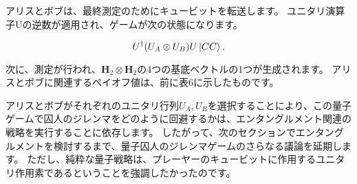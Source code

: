 アリスとボブは、最終測定のためにキュービットを転送します。 ユニタリ演算子Uの逆数が適用され、ゲームが次の状態になります。

\begin{equation}
\label{123}
U^{\dagger} ( U_A \otimes U_B ) U \ket{CC}.
\end{equation}

次に、測定が行われ、$\mathbf{H}_2 \otimes \mathbf{H}_2$の4つの基底ベクトルの1つが生成されます。 アリスとボブに関連するペイオフ値は、前に表6に示したものです。

アリスとボブがそれぞれのユニタリ行列$U_A, U_B$を選択することにより、この量子ゲームで囚人のジレンマをどのように回避するかは、エンタングルメント関連の戦略を実行することに依存します。 したがって、次のセクションでエンタングルメントを検討するまで、量子囚人のジレンマゲームのさらなる議論を延期します。 ただし、純粋な量子戦略は、プレーヤーのキュービットに作用するユニタリ作用素であるということを強調したかったのです。
